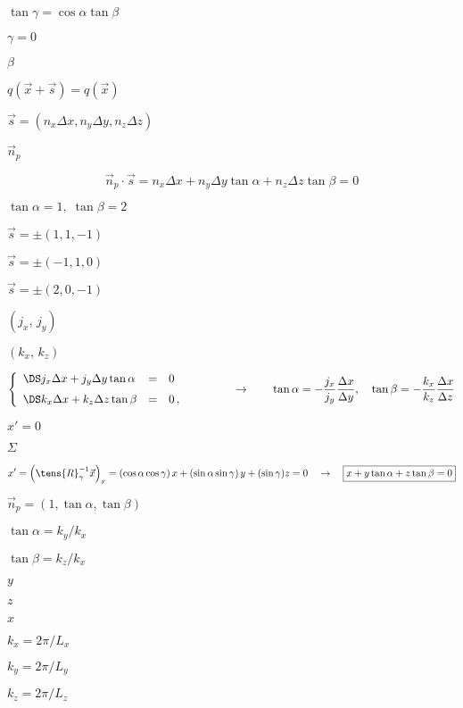 \documentclass{article}
\begin{document}
$\tan\gamma = \cos\alpha\tan\beta$
\pagebreak

$\gamma = 0$
\pagebreak

$\beta$
\pagebreak

$ q(\vec{x}+\vec{s}) = q (\vec{x})$
\pagebreak

$\vec{s} = (n_x\Delta x, n_y \Delta y, n_z \Delta z)$
\pagebreak

$\vec{n}_p$
\pagebreak

\[
  \vec{n}_p\cdot\vec{s} = n_x\Delta x + n_y\Delta y\tan\alpha
                                      + n_z\Delta z\tan\beta = 0
\]
\pagebreak

$\tan\alpha = 1,\;\tan\beta=2 $
\pagebreak

$\vec{s} = \pm(1,1,-1) $
\pagebreak

$\vec{s} = \pm (-1,1,0)$
\pagebreak

$\vec{s} = \pm (2,0,-1) $
\pagebreak

$(j_x,\, j_y)$
\pagebreak

$ (k_x,\, k_z)$
\pagebreak

\[
   \left\{\begin{array}{lcl}
    \DS j_x\Delta x + j_y\Delta y \tan\alpha &=& 0  \\ \noalign{\medskip}
    \DS k_x\Delta x + k_z\Delta z \tan\beta  &=& 0  \,,\qquad
  \end{array}\right.
  \qquad\rightarrow\qquad
    \tan\alpha = -\frac{j_x}{j_y}\frac{\Delta x}{\Delta y} ,\quad
    \tan\beta  = -\frac{k_x}{k_z}\frac{\Delta x}{\Delta z}
\]
\pagebreak

$x' = 0$
\pagebreak

$\Sigma$
\pagebreak

\[
  x' = \left(\tens{R}^{-1}_{\gamma} \vec{x}\right)_x
     =   (\cos\alpha\cos\gamma)\, x
       + (\sin\alpha\sin\gamma)\, y
       + (\sin\gamma) z = 0
  \quad\rightarrow\quad
  \boxed{x + y\tan\alpha + z\tan\beta = 0}
\]
\pagebreak

$\vec{n}_p = (1, \tan\alpha, \tan\beta)$
\pagebreak

$\tan\alpha = k_y/k_x$
\pagebreak

$\tan\beta = k_z/k_x$
\pagebreak

$y$
\pagebreak

$z$
\pagebreak

$x$
\pagebreak

$k_x = 2\pi/L_x$
\pagebreak

$k_y = 2\pi/L_y$
\pagebreak

$k_z = 2\pi/L_z$
\pagebreak
\end{document}
